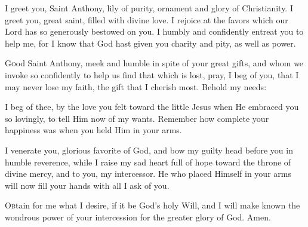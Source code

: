 {\centering\Large{\MakeUppercase{}}\par}

\begin{enpars}
\lettrine{I}{} greet you, Saint Anthony, lily of purity, ornament and glory of Christianity. I greet you, great saint, filled with divine love. I rejoice at the favors which our Lord has so generously bestowed on you. I humbly and confidently entreat you to help me, for I know that God hast given you charity and pity, as well as power.

\lettrine{G}{o}od Saint Anthony, meek and humble in spite of your great gifts, and whom we invoke so confidently to help us find that which is lost, pray, I beg of you, that I may never lose my faith, the gift that I cherish most. Behold my needs:


\lettrine{I}{} beg of thee, by the love you felt toward the little Jesus when He embraced you so lovingly, to tell Him now of my wants. Remember how complete your happiness was when you held Him in your arms.

\lettrine{I}{} venerate you, glorious favorite of God, and bow my guilty head before you in humble reverence, while I raise my sad heart full of hope toward the throne of divine mercy, and to you, my intercessor. He who placed Himself in your arms will now fill your hands with all I ask of you.

\lettrine{O}{b}tain for me what I desire, if it be God’s holy Will, and I will make known the wondrous power of your intercession for the greater glory of God. Amen.
\end{enpars}
